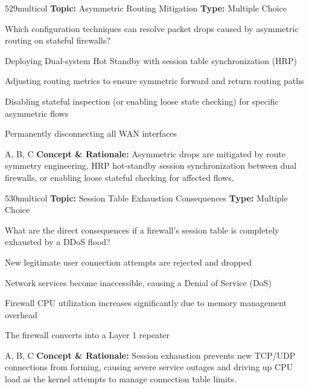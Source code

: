 \begin{qcard}{529}{multicol}
\textcolor{darkslate!75}{\small\textbf{Topic:} Asymmetric Routing Mitigation \hfill \textbf{Type:} Multiple Choice}\vspace{0.4em}\par
Which configuration techniques can resolve packet drops caused by asymmetric routing on stateful firewalls?
\begin{qoptions}
\item Deploying Dual-system Hot Standby with session table synchronization (HRP)
\item Adjusting routing metrics to ensure symmetric forward and return routing paths
\item Disabling stateful inspection (or enabling loose state checking) for specific asymmetric flows
\item Permanently disconnecting all WAN interfaces
\end{qoptions}
\end{qcard}
\nopagebreak
\begin{explainbox}{A, B, C}
\textbf{Concept \& Rationale:} Asymmetric drops are mitigated by route symmetry engineering, HRP hot-standby session synchronization between dual firewalls, or enabling loose stateful checking for affected flows.
\end{explainbox}

\begin{qcard}{530}{multicol}
\textcolor{darkslate!75}{\small\textbf{Topic:} Session Table Exhaustion Consequences \hfill \textbf{Type:} Multiple Choice}\vspace{0.4em}\par
What are the direct consequences if a firewall's session table is completely exhausted by a DDoS flood?
\begin{qoptions}
\item New legitimate user connection attempts are rejected and dropped
\item Network services become inaccessible, causing a Denial of Service (DoS)
\item Firewall CPU utilization increases significantly due to memory management overhead
\item The firewall converts into a Layer 1 repeater
\end{qoptions}
\end{qcard}
\nopagebreak
\begin{explainbox}{A, B, C}
\textbf{Concept \& Rationale:} Session exhaustion prevents new TCP/UDP connections from forming, causing severe service outages and driving up CPU load as the kernel attempts to manage connection table limits.
\end{explainbox}

